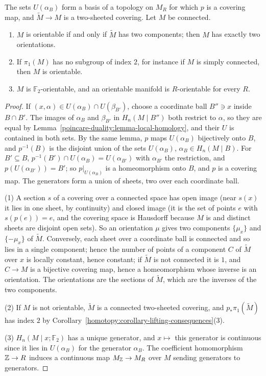 \begin{proposition}\label{poincare-duality:proposition-orientation-covering}
The sets $U(\alpha_B)$ form a basis of a topology on $M_R$ for which $p$ is a covering map, and $\tilde{M} \to M$ is a two-sheeted covering. Let $M$ be connected.
\begin{enumerate}
\item $M$ is orientable if and only if $\tilde{M}$ has two components; then $M$ has exactly two orientations.
\item If $\pi_1(M)$ has no subgroup of index $2$, for instance if $M$ is simply connected, then $M$ is orientable.
\item $M$ is $\mathbb{F}_2$-orientable, and an orientable manifold is $R$-orientable for every $R$.
\end{enumerate}
\end{proposition}

\begin{proof}
If $(x, \alpha) \in U(\alpha_B) \cap U(\beta_{B'})$, choose a coordinate ball $B'' \ni x$ inside $B \cap B'$. The images of $\alpha_B$ and $\beta_{B'}$ in
$H_n(M \mid B'')$ both restrict to $\alpha$, so they are equal by Lemma~\ref{poincare-duality:lemma-local-homology}, and their $U$ is contained in both sets.
By the same lemma, $p$ maps $U(\alpha_B)$ bijectively onto $B$, and $p^{-1}(B)$ is the disjoint union of the sets $U(\alpha_B)$, $\alpha_B \in H_n(M \mid B)$. For
$B' \subseteq B$, $p^{-1}(B') \cap U(\alpha_B) = U(\alpha_{B'})$ with $\alpha_{B'}$ the restriction, and $p(U(\alpha_{B'})) = B'$; so $p|_{U(\alpha_B)}$ is a homeomorphism
onto $B$, and $p$ is a covering map. The generators form a union of sheets, two over each coordinate ball.

(1) A section $s$ of a covering over a connected space has open image (near $s(x)$ it lies in one sheet, by continuity) and closed image (it is the set of points $e$ with $s(p(e)) = e$, and the covering space is Hausdorff because $M$ is and distinct sheets are
disjoint open sets). So an orientation $\mu$ gives two components $\{\mu_x\}$ and $\{-\mu_x\}$ of
$\tilde{M}$. Conversely, each sheet over a coordinate ball is connected and so lies in a single component; hence the number of points of a component
$C$ of $\tilde{M}$ over $x$ is locally constant, hence constant; if $\tilde{M}$ is not connected it is $1$,
and $C \to M$ is a bijective covering map, hence a homeomorphism whose inverse is an orientation. The orientations are the sections of $\tilde{M}$, which are the
inverses of the two components.

(2) If $M$ is not orientable, $\tilde{M}$ is a connected two-sheeted covering, and $p_*\pi_1(\tilde{M})$ has index $2$ by
Corollary~\ref{homotopy:corollary-lifting-consequences}(3).

(3) $H_n(M \mid x; \mathbb{F}_2)$ has a unique generator, and $x \mapsto$ this generator is continuous since it lies in $U(\alpha_B)$ for the generator $\alpha_B$. The
coefficient homomorphism $\mathbb{Z} \to R$ induces a continuous map $M_{\mathbb{Z}} \to M_R$ over $M$ sending generators to generators.
\end{proof}

